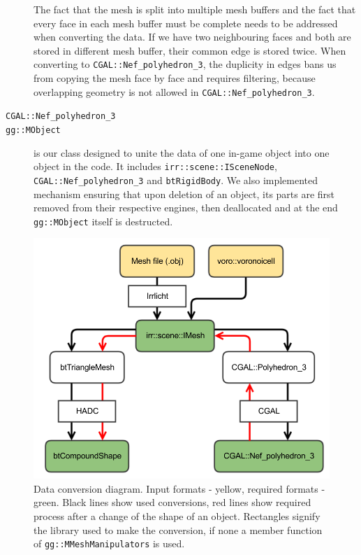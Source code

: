 \begin{description}
The fact that the mesh is split into multiple mesh buffers and the fact that every face in each mesh buffer must be complete needs to be addressed when converting the data. If we have two neighbouring faces and both are stored in different mesh buffer, their common edge is stored twice. When converting to {\tt CGAL::Nef\_polyhedron\_3}, the duplicity in edges bans us from copying the mesh face by face and requires filtering, because overlapping geometry is not allowed in {\tt CGAL::Nef\_polyhedron\_3}.

\item [{\tt CGAL::Nef\_polyhedron\_3}]

\item [{\tt gg::MObject}] is our class designed to unite the data of one in-game object into one object in the code. It includes {\tt irr::scene::ISceneNode}, {\tt CGAL::Nef\_polyhedron\_3} and {\tt btRigidBody}. We also implemented mechanism ensuring that upon deletion of an object, its parts are first removed from their respective engines, then deallocated and at the end {\tt gg::MObject} itself is destructed.

\end{description}

\begin{figure}
        \centering
        \includegraphics[width=\textwidth]{img/conversions}
        \caption{Data conversion diagram. Input formats - yellow, required formats - green. Black lines show used conversions, red lines show required process after a change of the shape of an object. Rectangles signify the library used to make the conversion, if none a member function of {\tt gg::MMeshManipulators} is used.}
        \label{fig:conversions}
\end{figure}

